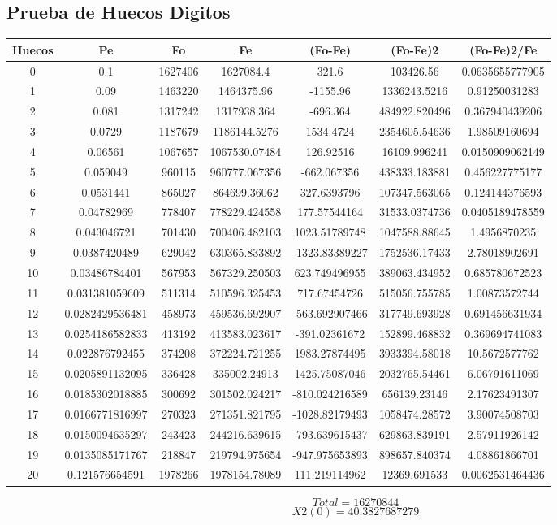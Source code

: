 \documentclass{article}
\begin{document}
\subsection{Prueba de Huecos Digitos}
\begin{tabular}{|c|c|c|c|c|c|c|}
Huecos&Pe&Fo&Fe&(Fo{-}Fe)&(Fo{-}Fe)2&(Fo{-}Fe)2/Fe\\
\hline
0&0.1&1627406&1627084.4&321.6&103426.56&0.0635655777905\\
\hline
1&0.09&1463220&1464375.96&{-}1155.96&1336243.5216&0.91250031283\\
\hline
2&0.081&1317242&1317938.364&{-}696.364&484922.820496&0.367940439206\\
\hline
3&0.0729&1187679&1186144.5276&1534.4724&2354605.54636&1.98509160694\\
\hline
4&0.06561&1067657&1067530.07484&126.92516&16109.996241&0.0150909062149\\
\hline
5&0.059049&960115&960777.067356&{-}662.067356&438333.183881&0.456227775177\\
\hline
6&0.0531441&865027&864699.36062&327.6393796&107347.563065&0.124144376593\\
\hline
7&0.04782969&778407&778229.424558&177.57544164&31533.0374736&0.0405189478559\\
\hline
8&0.043046721&701430&700406.482103&1023.51789748&1047588.88645&1.4956870235\\
\hline
9&0.0387420489&629042&630365.833892&{-}1323.83389227&1752536.17433&2.78018902691\\
\hline
10&0.03486784401&567953&567329.250503&623.749496955&389063.434952&0.685780672523\\
\hline
11&0.031381059609&511314&510596.325453&717.67454726&515056.755785&1.00873572744\\
\hline
12&0.0282429536481&458973&459536.692907&{-}563.692907466&317749.693928&0.691456631934\\
\hline
13&0.0254186582833&413192&413583.023617&{-}391.02361672&152899.468832&0.369694741083\\
\hline
14&0.022876792455&374208&372224.721255&1983.27874495&3933394.58018&10.5672577762\\
\hline
15&0.0205891132095&336428&335002.24913&1425.75087046&2032765.54461&6.06791611069\\
\hline
16&0.0185302018885&300692&301502.024217&{-}810.024216589&656139.23146&2.17623491307\\
\hline
17&0.0166771816997&270323&271351.821795&{-}1028.82179493&1058474.28572&3.90074508703\\
\hline
18&0.0150094635297&243423&244216.639615&{-}793.639615437&629863.839191&2.57911926142\\
\hline
19&0.0135085171767&218847&219794.975654&{-}947.975653893&898657.840374&4.08861866701\\
\hline
20&0.121576654591&1978266&1978154.78089&111.219114962&12369.691533&0.0062531464436\\
\end{tabular}
$$
Total = 16270844
$$
$$
X2(0) = 40.3827687279
$$
\end{document}
